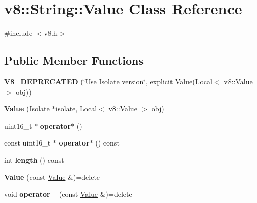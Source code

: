 \hypertarget{classv8_1_1String_1_1Value}{}\section{v8\+:\+:String\+:\+:Value Class Reference}
\label{classv8_1_1String_1_1Value}


{\ttfamily \#include $<$v8.\+h$>$}

\subsection*{Public Member Functions}
\begin{DoxyCompactItemize}
\item 
\mbox{\label{classv8_1_1String_1_1Value_a7492b1ad56f1056b4957c768e7341a1c}} 
{\bfseries V8\+\_\+\+D\+E\+P\+R\+E\+C\+A\+T\+ED} (\char`\"{}Use \mbox{\hyperlink{classv8_1_1Isolate}{Isolate}} version\char`\"{}, explicit \mbox{\hyperlink{classv8_1_1String_1_1Value}{Value}}(\mbox{\hyperlink{classv8_1_1Local}{Local}}$<$ \mbox{\hyperlink{classv8_1_1Value}{v8\+::\+Value}} $>$ obj))
\item 
\mbox{\label{classv8_1_1String_1_1Value_a9254394df4e1c4a8d9749cc0a5b55601}} 
{\bfseries Value} (\mbox{\hyperlink{classv8_1_1Isolate}{Isolate}} $\ast$isolate, \mbox{\hyperlink{classv8_1_1Local}{Local}}$<$ \mbox{\hyperlink{classv8_1_1Value}{v8\+::\+Value}} $>$ obj)
\item 
\mbox{\label{classv8_1_1String_1_1Value_ae4f44b1977968de2e9f2ff703437fde3}} 
uint16\+\_\+t $\ast$ {\bfseries operator$\ast$} ()
\item 
\mbox{\label{classv8_1_1String_1_1Value_a15e247c80ec874daee13e6fca1b24629}} 
const uint16\+\_\+t $\ast$ {\bfseries operator$\ast$} () const
\item 
\mbox{\label{classv8_1_1String_1_1Value_aeb5be29097c4c23c2c63fe833145dfe4}} 
int {\bfseries length} () const
\item 
\mbox{\label{classv8_1_1String_1_1Value_ac7ef41f1e6890bb36bde462a11ea4de1}} 
{\bfseries Value} (const \mbox{\hyperlink{classv8_1_1String_1_1Value}{Value}} \&)=delete
\item 
\mbox{\label{classv8_1_1String_1_1Value_adb46ab85e1def9411012c67cbefb3385}} 
void {\bfseries operator=} (const \mbox{\hyperlink{classv8_1_1String_1_1Value}{Value}} \&)=delete
\end{DoxyCompactItemize}


